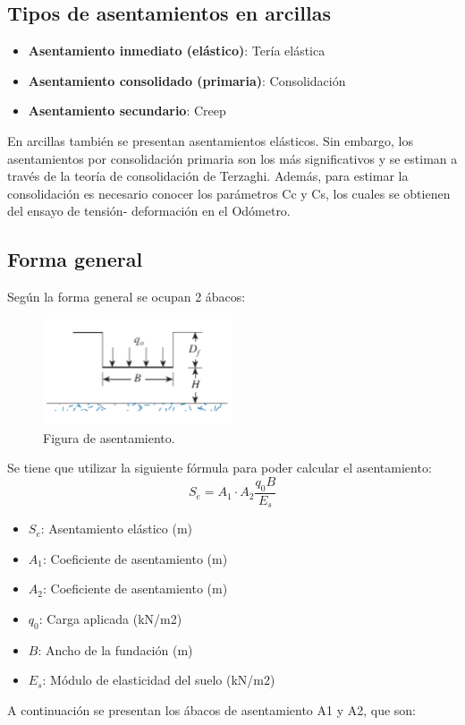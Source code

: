 \documentclass{article} %
\begin{document}
\subsection*{Tipos de asentamientos en arcillas}
\begin{itemize}
    \item \textbf{Asentamiento inmediato (elástico)}: Tería elástica
    \item \textbf{Asentamiento consolidado (primaria)}: Consolidación
    \item \textbf{Asentamiento secundario}: Creep
\end{itemize}

En arcillas también se presentan asentamientos elásticos.
Sin embargo, los asentamientos por consolidación primaria son los más
significativos y se estiman a través de la teoría de consolidación de
Terzaghi. Además, para estimar la consolidación es necesario conocer los
parámetros Cc y Cs, los cuales se obtienen del ensayo de tensión-
deformación en el Odómetro.

\subsection*{Forma general}
Según la forma general se ocupan 2 ábacos:

\begin{figure}[h]
    \centering
    \includegraphics[width=0.5\textwidth]{Graficos/asentamiento_3.PNG}
    \caption{Figura de asentamiento.}
    \label{fig:asentamiento1}
\end{figure}

Se tiene que utilizar la siguiente fórmula para poder calcular el asentamiento:
\[
S_e = A_1 \cdot A_2 \frac{q_0 B}{E_s}
\]


\begin{itemize}
    \item $S_e$: Asentamiento elástico (m)
    \item $A_1$: Coeficiente de asentamiento (m)
    \item $A_2$: Coeficiente de asentamiento (m)
    \item $q_0$: Carga aplicada (kN/m2)
    \item $B$: Ancho de la fundación (m)
    \item $E_s$: Módulo de elasticidad del suelo (kN/m2)
\end{itemize}
\newpage
A continuación se presentan los ábacos de asentamiento A1 y A2, que son:
\end{document}
